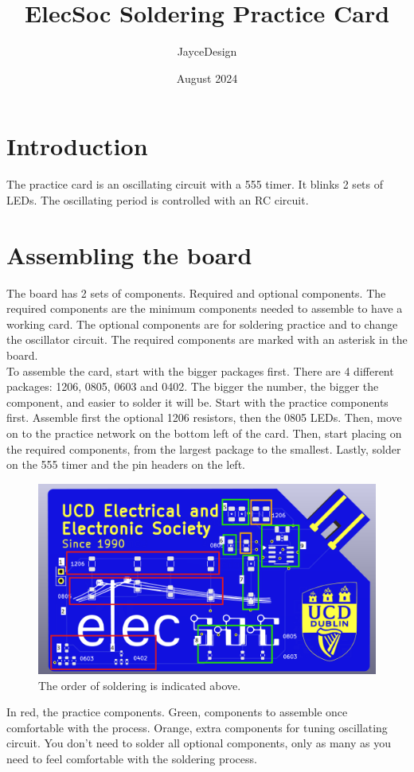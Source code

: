 \documentclass{article}
\title{ElecSoc Soldering Practice Card}
\author{JayceDesign}
\date{August 2024}
\begin{document}
\maketitle

\section{Introduction}
The practice card is an oscillating circuit with a 555 timer. It blinks 2 sets of LEDs. The oscillating period is controlled with an RC circuit.

\section{Assembling the board}
The board has 2 sets of components. Required and optional components. The required components are the minimum components needed to assemble to have a working card. The optional components are for soldering practice and to change the oscillator circuit. The required components are marked with an asterisk in the board.\\
To assemble the card, start with the bigger packages first. There are 4 different packages: 1206, 0805, 0603 and 0402. The bigger the number, the bigger the component, and easier to solder it will be. Start with the practice components first. Assemble first the optional 1206 resistors, then the 0805 LEDs. Then, move on to the practice network on the bottom left of the card. Then, start placing on the required components, from the largest package to the smallest. Lastly, solder on the 555 timer and the pin headers on the left.
\begin{figure} [H]
    \centering
    \includegraphics[width=0.6\linewidth]{Practice board marked.png}
    \caption{The order of soldering is indicated above.}
    \label{fig:enter-label}
\end{figure}
In red, the practice components. Green, components to assemble once comfortable with the process. Orange, extra components for tuning oscillating circuit. You don't need to solder all optional components, only as many as you need to feel comfortable with the soldering process.
\end{document}
